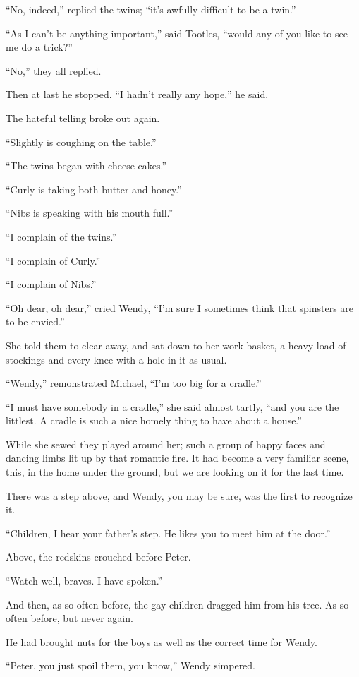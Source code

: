 ``No, indeed,'' replied the twins; ``it's awfully difficult to be a twin.''

``As I can't be anything important,'' said Tootles, ``would any of you
like to see me do a trick?''

``No,'' they all replied.

Then at last he stopped. ``I hadn't really any hope,'' he said.

The hateful telling broke out again.

``Slightly is coughing on the table.''

``The twins began with cheese-cakes.''

``Curly is taking both butter and honey.''

``Nibs is speaking with his mouth full.''

``I complain of the twins.''

``I complain of Curly.''

``I complain of Nibs.''

``Oh dear, oh dear,'' cried Wendy, ``I'm sure I sometimes think that
spinsters are to be envied.''

She told them to clear away, and sat down to her work-basket, a heavy
load of stockings and every knee with a hole in it as usual.

``Wendy,'' remonstrated Michael, ``I'm too big for a cradle.''

``I must have somebody in a cradle,'' she said almost tartly, ``and you
are the littlest. A cradle is such a nice homely thing to have about a
house.''

While she sewed they played around her; such a group of happy faces and
dancing limbs lit up by that romantic fire. It had become a very
familiar scene, this, in the home under the ground, but we are looking
on it for the last time.

There was a step above, and Wendy, you may be sure, was the first to
recognize it.

``Children, I hear your father's step. He likes you to meet him at the
door.''

Above, the redskins crouched before Peter.

``Watch well, braves. I have spoken.''

And then, as so often before, the gay children dragged him from his
tree. As so often before, but never again.

He had brought nuts for the boys as well as the correct time for Wendy.

``Peter, you just spoil them, you know,'' Wendy simpered.


